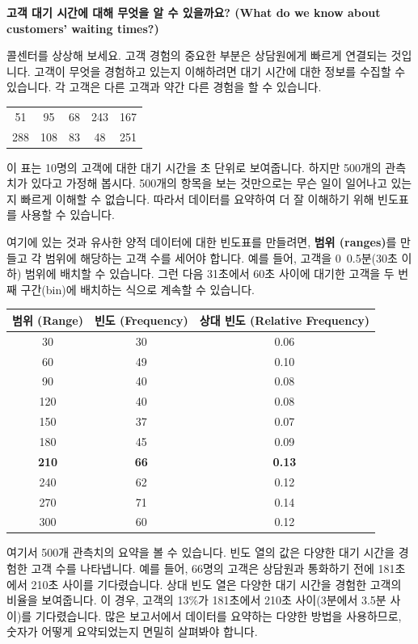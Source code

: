 \documentclass[11pt,a4paper]{article}
\begin{document}
\begin{tcolorbox}[title={양적 데이터에 대한 빈도표 (Frequency Table for Quantitative Data)}]
\textbf{고객 대기 시간에 대해 무엇을 알 수 있을까요? (What do we know about customers’ waiting times?)}

콜센터를 상상해 보세요. 고객 경험의 중요한 부분은 상담원에게 빠르게 연결되는 것입니다. 고객이 무엇을 경험하고 있는지 이해하려면 대기 시간에 대한 정보를 수집할 수 있습니다. 각 고객은 다른 고객과 약간 다른 경험을 할 수 있습니다.

\begin{center}
\label{tab:customer_waiting_time_raw}
\begin{tabular}{ccccc}
\toprule
51 & 95 & 68 & 243 & 167 \\
288 & 108 & 83 & 48 & 251 \\
\bottomrule
\end{tabular}
\end{center}
이 표는 10명의 고객에 대한 대기 시간을 초 단위로 보여줍니다. 하지만 500개의 관측치가 있다고 가정해 봅시다. 500개의 항목을 보는 것만으로는 무슨 일이 일어나고 있는지 빠르게 이해할 수 없습니다. 따라서 데이터를 요약하여 더 잘 이해하기 위해 빈도표를 사용할 수 있습니다.

여기에 있는 것과 유사한 양적 데이터에 대한 빈도표를 만들려면, \textbf{범위 (ranges)}를 만들고 각 범위에 해당하는 고객 수를 세어야 합니다. 예를 들어, 고객을 0~0.5분(30초 이하) 범위에 배치할 수 있습니다. 그런 다음 31초에서 60초 사이에 대기한 고객을 두 번째 구간(bin)에 배치하는 식으로 계속할 수 있습니다.

\begin{center}
\label{tab:quantitative_frequency_table}
\begin{tabular}{ccc}
\toprule
\textbf{범위 (Range)} & \textbf{빈도 (Frequency)} & \textbf{상대 빈도 (Relative Frequency)} \\
\midrule
30 & 30 & 0.06 \\
60 & 49 & 0.10 \\
90 & 40 & 0.08 \\
120 & 40 & 0.08 \\
150 & 37 & 0.07 \\
180 & 45 & 0.09 \\
\textbf{210} & \textbf{66} & \textbf{0.13} \\ %
240 & 62 & 0.12 \\
270 & 71 & 0.14 \\
300 & 60 & 0.12 \\
\bottomrule
\end{tabular}
\end{center}
여기서 500개 관측치의 요약을 볼 수 있습니다. 빈도 열의 값은 다양한 대기 시간을 경험한 고객 수를 나타냅니다. 예를 들어, 66명의 고객은 상담원과 통화하기 전에 181초에서 210초 사이를 기다렸습니다. 상대 빈도 열은 다양한 대기 시간을 경험한 고객의 비율을 보여줍니다. 이 경우, 고객의 13\%가 181초에서 210초 사이(3분에서 3.5분 사이)를 기다렸습니다. 많은 보고서에서 데이터를 요약하는 다양한 방법을 사용하므로, 숫자가 어떻게 요약되었는지 면밀히 살펴봐야 합니다.
\end{tcolorbox}
\end{document}
